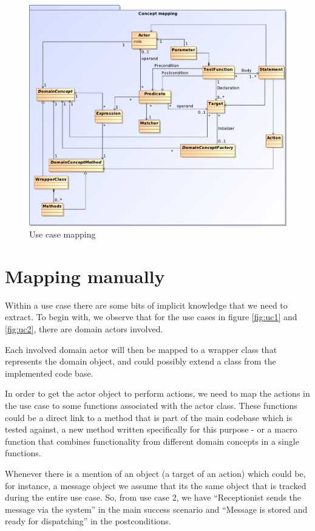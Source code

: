\begin{figure}[h]
  \centering
 
  \includegraphics[scale=0.72]{img/use_case_mapping}
  \caption{Use case mapping}
  \label{fig:use_case_mapping}
\end{figure}

\section{Mapping manually}
Within a use case there are some bits of implicit knowledge that we need to extract. To begin with, we observe that for the use cases in figure \ref{fig:uc1} and \ref{fig:uc2}, there are domain actors involved.

Each involved domain actor will then be mapped to a wrapper class that represents the domain object, and could possibly extend a class from the implemented code base.

In order to get the actor object to perform actions, we need to map the actions in the use case to some functions associated with the actor class. These functions could be a direct link to a method that is part of the main codebase which is tested against, a new method written specifically for this purpose - or a macro function that combines functionality from different domain concepts in a single functions.

Whenever there is a mention of an object (a target of an action) which could be, for instance, a message object we assume that its the same object that is tracked during the entire use case. So, from use case 2, we have ``Receptionist sends the message via the system'' in the main success scenario and ``Message is stored and ready for dispatching'' in the postconditions.

